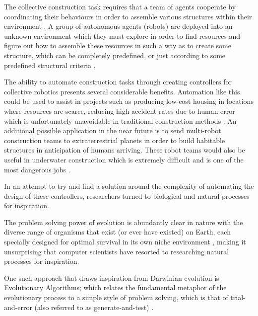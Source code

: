 The collective construction task requires that a team of agents cooperate by coordinating their behaviours in order to assemble various structures within their environment \cite{NitschkeSaEC2012}. A group of autonomous agents (robots) are deployed into an unknown environment which they must explore in order to find resources and figure out how to assemble these resources in such a way as to create some structure, which can be completely predefined, or just according to some predefined structural criteria \cite{NitschkeSaEC2012}.

The ability to automate construction tasks through creating controllers for collective robotics presents several considerable benefits. Automation like this could be used to assist in projects such as producing low-cost housing in locations where resources are scarce, reducing high accident rates due to human error which is unfortunately unavoidable in traditional construction methods \cite{ShenKhoshnevis2003}. An additional possible application in the near future is to send multi-robot construction teams to extraterrestrial planets in order to build habitable structures in anticipation of humans arriving. These robot teams would also be useful in underwater construction which is extremely difficult and is one of the most dangerous jobs \cite{RefWorks:30}.

In an attempt to try and find a solution around the complexity of automating the design of these controllers, researchers turned to biological and natural processes for inspiration.

The problem solving power of evolution is abundantly clear in nature with the diverse range of organisms that exist (or ever have existed) on Earth, each specially designed for optimal survival in its own niche environment \cite{RefWorks:33}, making it unsurprising that computer scientists have resorted to researching natural processes for inspiration. 

One such approach that draws inspiration from Darwinian evolution is Evolutionary Algorithms; which relates the fundamental metaphor of the evolutionary process to a simple style of problem solving, which is that of trial-and-error (also referred to as generate-and-test) \cite{RefWorks:33}.



